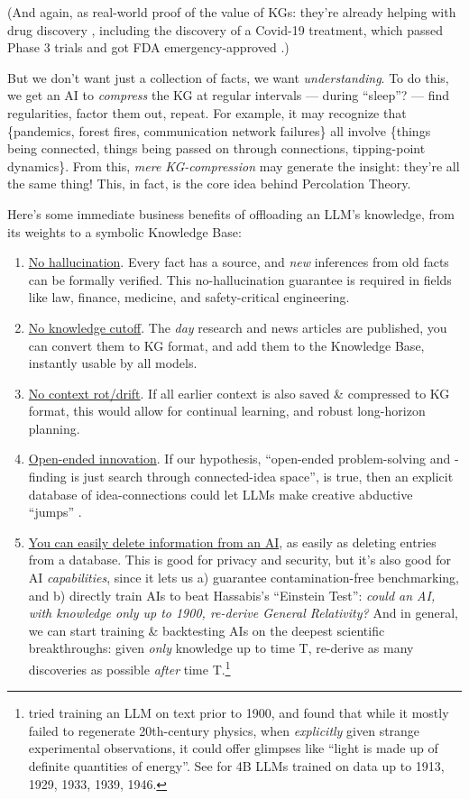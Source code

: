 \documentclass[11pt]{article}
\begin{document}
(And again, as real-world proof of the value of KGs: they're already helping with drug discovery \citep{kg_drug_discovery_review}, including the discovery of a Covid-19 treatment, which passed Phase 3 trials and got FDA emergency-approved \citep{baricitinib_kg,baricitinib_kg_method}.)

But we don't want just a collection of facts, we want \textit{understanding}. To do this, we get an AI to \textit{compress} the KG at regular intervals — during ``sleep''? — find regularities, factor them out, repeat. For example, it may recognize that \{pandemics, forest fires, communication network failures\} all involve \{things being connected, things being passed on through connections, tipping-point dynamics\}. From this, \textit{mere KG-compression} may generate the insight: they're all the same thing! This, in fact, is the core idea behind Percolation Theory.

Here's some immediate business benefits of offloading an LLM's knowledge, from its weights to a symbolic Knowledge Base:

\begin{enumerate}
    \item \uline{No hallucination}. Every fact has a source, and \textit{new} inferences from old facts can be formally verified. This no-hallucination guarantee is required in fields like law, finance, medicine, and safety-critical engineering. 
    \item \uline{No knowledge cutoff}. The \textit{day} research and news articles are published, you can convert them to KG format, and add them to the Knowledge Base, instantly usable by all models.
    \item \uline{No context rot/drift}. If all earlier context is also saved \& compressed to KG format, this would allow for continual learning, and robust long-horizon planning.
    \item \uline{Open-ended innovation}. If our hypothesis, ``open-ended problem-solving and -finding is just search through connected-idea space'', is true, then an explicit database of idea-connections could let LLMs make creative abductive ``jumps'' \citep{llms_cant_jump}. 
    \item \uline{You can easily delete information from an AI}, as easily as deleting entries from a database. This is good for privacy and security, but it's also good for AI \textit{capabilities}, since it lets us a) guarantee contamination-free benchmarking, and b) directly train AIs to beat Hassabis's ``Einstein Test'': \textit{could an AI, with knowledge only up to 1900, re-derive General Relativity?} And in general, we can start training \& backtesting AIs on the deepest scientific breakthroughs: given \textit{only} knowledge up to time T, re-derive as many discoveries as possible \textit{after} time T.\footnote{\citet{gpt1900} tried training an LLM on text prior to 1900, and found that while it mostly failed to regenerate 20th-century physics, when \textit{explicitly} given strange experimental observations, it could offer glimpses like “light is made up of definite quantities of energy”. See \citet{history_llms} for 4B LLMs trained on data up to 1913, 1929, 1933, 1939, 1946.}
\end{enumerate}
\end{document}
